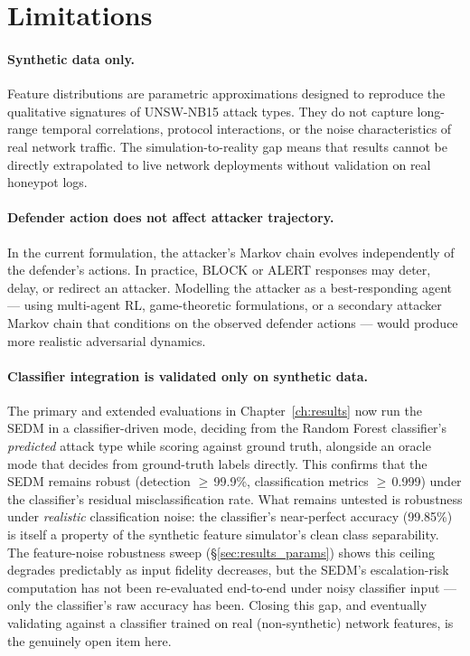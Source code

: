 \section{Limitations}
\label{sec:disc_limitations}

\paragraph{Synthetic data only.}
Feature distributions are parametric approximations designed to reproduce
the qualitative signatures of UNSW-NB15 attack types.
They do not capture long-range temporal correlations, protocol interactions,
or the noise characteristics of real network traffic.
The simulation-to-reality gap means that results cannot be directly
extrapolated to live network deployments without validation on real
honeypot logs.

\paragraph{Defender action does not affect attacker trajectory.}
In the current formulation, the attacker's Markov chain evolves
independently of the defender's actions.
In practice, BLOCK or ALERT responses may deter, delay, or redirect an
attacker.
Modelling the attacker as a best-responding agent --- using multi-agent RL,
game-theoretic formulations, or a secondary attacker Markov chain that
conditions on the observed defender actions --- would produce more realistic
adversarial dynamics.

\paragraph{Classifier integration is validated only on synthetic data.}
The primary and extended evaluations in Chapter~\ref{ch:results} now run
the SEDM in a classifier-driven mode, deciding from the Random Forest
classifier's \emph{predicted} attack type while scoring against ground
truth, alongside an oracle mode that decides from ground-truth labels
directly.
This confirms that the SEDM remains robust (detection $\ge$\,99.9\%,
classification metrics $\ge$\,0.999) under the classifier's residual
misclassification rate.
What remains untested is robustness under \emph{realistic} classification
noise: the classifier's near-perfect accuracy (99.85\%) is itself a
property of the synthetic feature simulator's clean class separability.
The feature-noise robustness sweep (\S\ref{sec:results_params}) shows this
ceiling degrades predictably as input fidelity decreases, but the SEDM's
escalation-risk computation has not been re-evaluated end-to-end under
noisy classifier input --- only the classifier's raw accuracy has been.
Closing this gap, and eventually validating against a classifier trained on
real (non-synthetic) network features, is the genuinely open item here.

